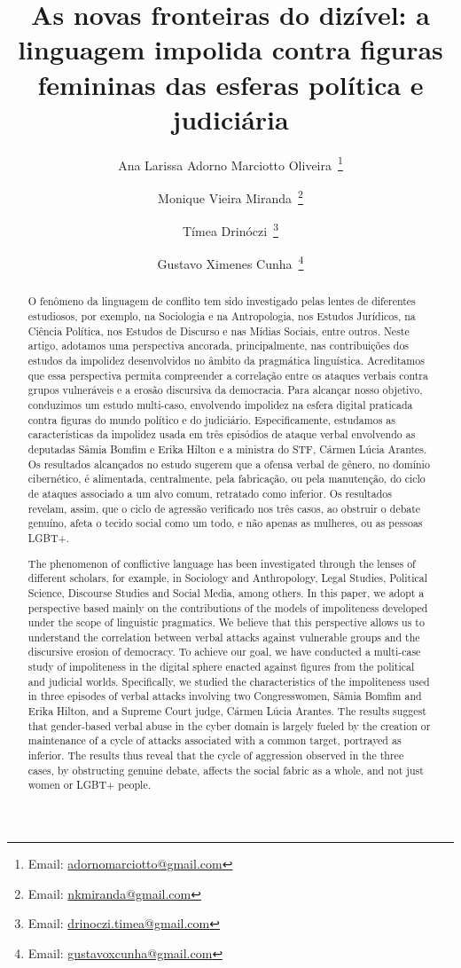 \documentclass[portuguese]{textolivre}
\title{As novas fronteiras do dizível: a linguagem impolida contra figuras femininas das esferas política e judiciária}
\author[1]{Ana Larissa Adorno Marciotto Oliveira~\orcid{0000-0003-1857-0207}\thanks{Email: \href{mailto:adornomarciotto@gmail.com}{adornomarciotto@gmail.com}}}
\author[1]{Monique Vieira Miranda~\orcid{0000-0002-0935-5604}\thanks{Email: \href{mailto:nkmiranda@gmail.com}{nkmiranda@gmail.com}}}
\author[2]{Tímea Drinóczi~\orcid{0000-0002-7657-3572}\thanks{Email: \href{drinoczi.timea@gmail.com}{drinoczi.timea@gmail.com}}}
\author[1]{Gustavo Ximenes Cunha~\orcid{0000-0001-9953-1204}\thanks{Email: \href{gustavoxcunha@gmail.com}{gustavoxcunha@gmail.com}}}
\affil[1]{Universidade Federal de Minas Gerais, Faculdade de Letras, Belo Horizonte, MG, Brasil.}
\affil[2]{Universidade Federal de Minas Gerais, Faculdade de Direito, Belo Horizonte, MG, Brasil.}
\begin{document}
\maketitle

\begin{polyabstract}
\begin{abstract}
O fenômeno da linguagem de conflito tem sido investigado pelas lentes de diferentes estudiosos, por exemplo, na Sociologia e na Antropologia, nos Estudos Jurídicos, na Ciência Política, nos Estudos de Discurso e nas Mídias Sociais, entre outros. Neste artigo, adotamos uma perspectiva ancorada, principalmente, nas contribuições dos estudos da impolidez desenvolvidos no âmbito da pragmática linguística. Acreditamos que essa perspectiva permita compreender a correlação entre os ataques verbais contra grupos vulneráveis e a erosão discursiva da democracia. Para alcançar nosso objetivo, conduzimos um estudo multi-caso, envolvendo impolidez na esfera digital praticada contra figuras do mundo político e do judiciário. Especificamente, estudamos as características da impolidez usada em três episódios de ataque verbal envolvendo as deputadas Sâmia Bomfim e Erika Hilton e a ministra do STF, Cármen Lúcia Arantes. Os resultados alcançados no estudo sugerem que a ofensa verbal de gênero, no domínio cibernético, é alimentada, centralmente, pela fabricação, ou pela manutenção, do ciclo de ataques associado a um alvo comum, retratado como inferior. Os resultados revelam, assim, que o ciclo de agressão verificado nos três casos, ao obstruir o debate genuíno, afeta o tecido social como um todo, e não apenas as mulheres, ou as pessoas LGBT+.

\end{abstract}

\begin{english}
\begin{abstract}
The phenomenon of conflictive language has been investigated through the lenses of different scholars, for example, in Sociology and Anthropology, Legal Studies, Political Science, Discourse Studies and Social Media, among others. In this paper, we adopt a perspective based mainly on the contributions of the models of impoliteness developed under the scope of linguistic pragmatics. We believe that this perspective allows us to understand the correlation between verbal attacks against vulnerable groups and the discursive erosion of democracy. To achieve our goal, we have conducted a multi-case study of impoliteness in the digital sphere enacted against figures from the political and judicial worlds. Specifically, we studied the characteristics of the impoliteness used in three episodes of verbal attacks involving two Congresswomen, Sâmia Bomfim and Erika Hilton, and a Supreme Court judge, Cármen Lúcia Arantes. The results suggest that gender-based verbal abuse in the cyber domain is largely fueled by the creation or maintenance of a cycle of attacks associated with a common target, portrayed as inferior. The results thus reveal that the cycle of aggression observed in the three cases, by obstructing genuine debate, affects the social fabric as a whole, and not just women or LGBT+ people.


\end{abstract}
\end{english}
\end{polyabstract}
\end{document}
